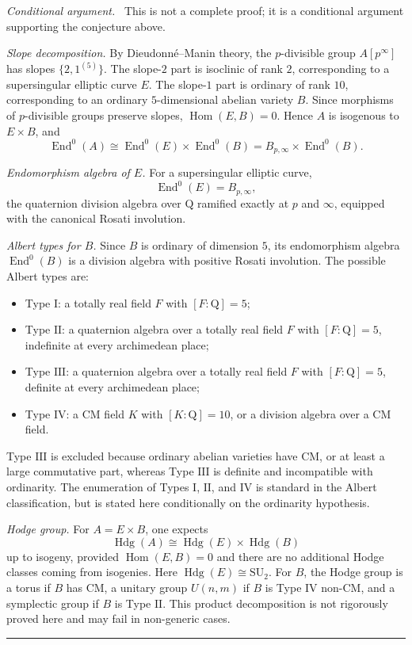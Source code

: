 \documentclass{article}
\newcommand{\mathbb}[1]{\mathrm{#1}}
\newenvironment{proof}[1][Proof]{\par\noindent\textit{#1.}\ }{\hfill\rule{1.2ex}{1.2ex}\par}
\begin{document}
\begin{proof}[Conditional argument]
This is not a complete proof; it is a conditional argument supporting the conjecture above.

\emph{Slope decomposition.} By Dieudonné--Manin theory, the \(p\)-divisible group \(A[p^\infty]\) has slopes \(\{2,1^{(5)}\}\). The slope-\(2\) part is isoclinic of rank \(2\), corresponding to a supersingular elliptic curve \(E\). The slope-\(1\) part is ordinary of rank \(10\), corresponding to an ordinary \(5\)-dimensional abelian variety \(B\). Since morphisms of \(p\)-divisible groups preserve slopes, \(\operatorname{Hom}(E,B)=0\). Hence \(A\) is isogenous to \(E\times B\), and
\[
\operatorname{End}^0(A)\cong \operatorname{End}^0(E)\times \operatorname{End}^0(B)
= B_{p,\infty}\times \operatorname{End}^0(B).
\]

\emph{Endomorphism algebra of \(E\).} For a supersingular elliptic curve,
\[
\operatorname{End}^0(E)=B_{p,\infty},
\]
the quaternion division algebra over \(\mathbb{Q}\) ramified exactly at \(p\) and \(\infty\), equipped with the canonical Rosati involution.

\emph{Albert types for \(B\).} Since \(B\) is ordinary of dimension \(5\), its endomorphism algebra \(\operatorname{End}^0(B)\) is a division algebra with positive Rosati involution. The possible Albert types are:
\begin{itemize}
\item Type \(\mathrm{I}\): a totally real field \(F\) with \([F:\mathbb{Q}]=5\);
\item Type \(\mathrm{II}\): a quaternion algebra over a totally real field \(F\) with \([F:\mathbb{Q}]=5\), indefinite at every archimedean place;
\item Type \(\mathrm{III}\): a quaternion algebra over a totally real field \(F\) with \([F:\mathbb{Q}]=5\), definite at every archimedean place;
\item Type \(\mathrm{IV}\): a CM field \(K\) with \([K:\mathbb{Q}]=10\), or a division algebra over a CM field.
\end{itemize}
Type \(\mathrm{III}\) is excluded because ordinary abelian varieties have CM, or at least a large commutative part, whereas Type \(\mathrm{III}\) is definite and incompatible with ordinarity. The enumeration of Types \(\mathrm{I}\), \(\mathrm{II}\), and \(\mathrm{IV}\) is standard in the Albert classification, but is stated here conditionally on the ordinarity hypothesis.

\emph{Hodge group.} For \(A=E\times B\), one expects
\[
\operatorname{Hdg}(A)\cong \operatorname{Hdg}(E)\times \operatorname{Hdg}(B)
\]
up to isogeny, provided \(\operatorname{Hom}(E,B)=0\) and there are no additional Hodge classes coming from isogenies. Here \(\operatorname{Hdg}(E)\cong \mathrm{SU}_2\). For \(B\), the Hodge group is a torus if \(B\) has CM, a unitary group \(U(n,m)\) if \(B\) is Type \(\mathrm{IV}\) non-CM, and a symplectic group if \(B\) is Type \(\mathrm{II}\). This product decomposition is not rigorously proved here and may fail in non-generic cases.


\end{proof}
\end{document}
